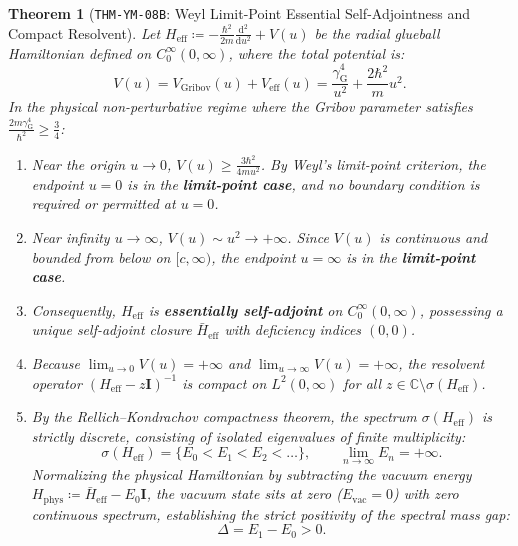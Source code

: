 \documentclass[11pt,a4paper,reqno]{article}
\theoremstyle{plain}
\newtheorem{theorem}{Theorem}[section]
\theoremstyle{definition}
\theoremstyle{remark}
\numberwithin{equation}{section}
\providecommand{\diff}{\mathrm{d}}
\begin{document}
\begin{theorem}[\texttt{THM-YM-08B}: Weyl Limit-Point Essential Self-Adjointness and Compact Resolvent]
\label{thm:ym_weyl_compact_resolvent}
Let $H_{\mathrm{eff}} \coloneqq -\frac{\hbar^2}{2m} \frac{\diff^2}{\diff u^2} + V(u)$ be the radial glueball Hamiltonian defined on $C_0^\infty(0, \infty)$, where the total potential is:
\begin{equation}
  V(u) = V_{\mathrm{Gribov}}(u) + V_{\mathrm{eff}}(u) = \frac{\gamma_{\mathrm{G}}^4}{u^2} + \frac{2\hbar^2}{m} u^2.
\end{equation}
In the physical non-perturbative regime where the Gribov parameter satisfies $\frac{2m\gamma_{\mathrm{G}}^4}{\hbar^2} \ge \frac{3}{4}$:
\begin{enumerate}[label=\textbf{(\roman*)}, leftmargin=2.0em]
  \item Near the origin $u \to 0$, $V(u) \ge \frac{3\hbar^2}{4m u^2}$. By Weyl's limit-point criterion, the endpoint $u = 0$ is in the \textbf{limit-point case}, and no boundary condition is required or permitted at $u = 0$.
  \item Near infinity $u \to \infty$, $V(u) \sim u^2 \to +\infty$. Since $V(u)$ is continuous and bounded from below on $[c, \infty)$, the endpoint $u = \infty$ is in the \textbf{limit-point case}.
  \item Consequently, $H_{\mathrm{eff}}$ is \textbf{essentially self-adjoint} on $C_0^\infty(0, \infty)$, possessing a unique self-adjoint closure $\bar{H}_{\mathrm{eff}}$ with deficiency indices $(0, 0)$.
  \item Because $\lim_{u \to 0} V(u) = +\infty$ and $\lim_{u \to \infty} V(u) = +\infty$, the resolvent operator $(H_{\mathrm{eff}} - z\mathbf{I})^{-1}$ is compact on $L^2(0, \infty)$ for all $z \in \mathbb{C} \setminus \sigma(H_{\mathrm{eff}})$.
  \item By the Rellich--Kondrachov compactness theorem, the spectrum $\sigma(H_{\mathrm{eff}})$ is strictly discrete, consisting of isolated eigenvalues of finite multiplicity:
  \begin{equation}
    \sigma(H_{\mathrm{eff}}) = \{ E_0 < E_1 < E_2 < \dots \}, \qquad \lim_{n \to \infty} E_n = +\infty.
  \end{equation}
  Normalizing the physical Hamiltonian by subtracting the vacuum energy $H_{\mathrm{phys}} \coloneqq \bar{H}_{\mathrm{eff}} - E_0 \mathbf{I}$, the vacuum state sits at zero ($E_{\mathrm{vac}} = 0$) with zero continuous spectrum, establishing the strict positivity of the spectral mass gap:
  \begin{equation}
    \Delta = E_1 - E_0 > 0.
  \end{equation}
\end{enumerate}
\end{theorem}
\end{document}
